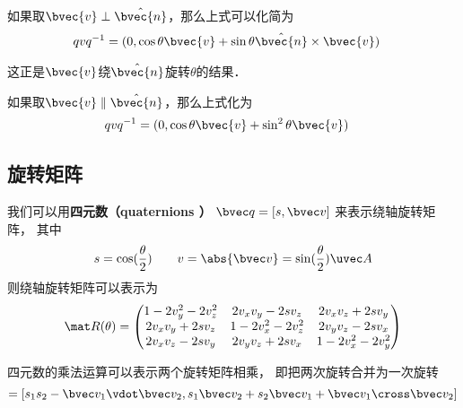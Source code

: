 如果取$\bvec{v}\perp\hat{\bvec{n}}$，那么上式可以化简为
\begin{equation}
\begin{aligned}
qvq^{-1}&=(0, \cos\theta\bvec{v}+\sin\theta\hat{\bvec{n}}\times\bvec{v})
\end{aligned}
\end{equation}

这正是$\bvec{v}$绕$\hat{\bvec{n}}$旋转$\theta$的结果．

如果取$\bvec{v}\parallel\hat{\bvec{n}}$，那么上式化为
\begin{equation}
\begin{aligned}
qvq^{-1}&=(0, \cos\theta\bvec{v}+\sin^2\theta\bvec{v})
\end{aligned}
\end{equation}%





\subsection{旋转矩阵}
我们可以用\textbf{四元数（quaternions ）} $\bvec q = [s, \bvec v]$ 来表示绕轴旋转矩阵， 其中
\begin{equation}
s = \cos(\frac{\theta}{2}) \qquad v = \abs{\bvec v} = \sin(\frac{\theta}{2})\uvec A
\end{equation}
则绕轴旋转矩阵可以表示为
\begin{equation}\label{QuatN_eq2}
\mat R(\theta) =
\begin{pmatrix}
1 - 2v_y^2 - 2v_z^2 & 2v_xv_y - 2sv_z  & 2v_x v_z + 2s v_y\\
2v_x v_y + 2sv_z & 1 - 2v_x^2 - 2v_z^2 & 2v_y v_z - 2s v_x\\
2v_x v_z - 2s v_y & 2v_y v_z + 2s v_x & 1 - 2v_x^2 - 2v_y^2
\end{pmatrix}
\end{equation}

四元数的乘法运算可以表示两个旋转矩阵相乘， 即把两次旋转合并为一次旋转
\begin{equation}
[s_1, \bvec v_1] [s_2, \bvec v_2] = [s_1 s_2 - \bvec v_1 \vdot \bvec v_2, s_1 \bvec v_2 + s_2 \bvec v_1 + \bvec v_1 \cross \bvec v_2]
\end{equation}

